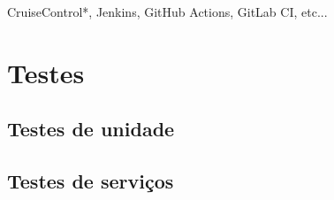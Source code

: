 CruiseControl*, Jenkins, GitHub Actions, GitLab CI, etc...








\section{Testes}

\subsection{Testes de unidade}

\subsection{Testes de serviços}

